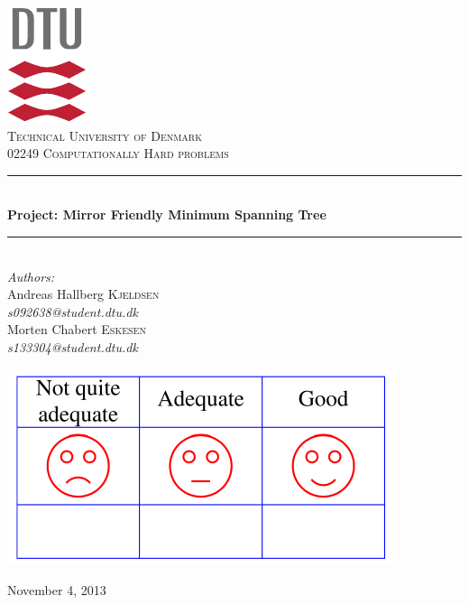 \documentclass[12pt]{report}
\newcommand{\HRuleFat}{\rule{\linewidth}{0.5mm}}
\begin{document}
\begin{titlepage}
\begin{center}

\includegraphics[scale=2.0]{dtu_logo.pdf}\\[0.70cm]

\textsc{\LARGE Technical University of Denmark}\\[.85cm]

\textsc{\Large 02249 Computationally Hard problems}\\[0.35cm]


\HRuleFat \\[0.4cm]
{\huge \bfseries Project: Mirror Friendly Minimum Spanning Tree}\\[0.1cm]
\HRuleFat \\[0.4cm]

\large
\emph{Authors:}
\\[10pt]
Andreas Hallberg \textsc{Kjeldsen}\\
\emph{s092638@student.dtu.dk}
\\[10pt]
Morten Chabert \textsc{Eskesen}\\
\emph{s133304@student.dtu.dk}
\\[10pt]

\vfill

\includegraphics[scale=1]{Evurd.pdf}

{\large November 4, 2013}

\end{center}
\end{titlepage}
\end{document}
